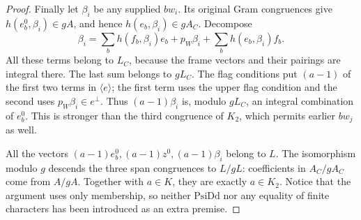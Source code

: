 \documentclass[11pt,a4paper]{article}
\numberwithin{equation}{section}
\theoremstyle{remark}\newtheorem{remark}[theorem]{Remark}
\begin{document}
\begin{proof}
Finally let \(\beta_i\) be any supplied \(bw_i\).  Its original
Gram congruences give \(h(e_b^0,\beta_i)\in gA\), and hence
\(h(e_b,\beta_i)\in gA_C\).  Decompose
\[
 \beta_i=\sum_b h(f_b,\beta_i)e_b+p_W\beta_i
                              +\sum_b h(e_b,\beta_i)f_b.
\]
All these terms belong to \(L_C\), because the frame vectors
and their pairings are integral there.  The last sum belongs to
\(gL_C\).  The flag conditions put \((a-1)\) of the first
two terms in \(\langle e\rangle\); the first term uses the
upper flag condition and the second uses \(p_W\beta_i\in e^\perp\).
Thus \((a-1)\beta_i\) is, modulo \(gL_C\), an integral
combination of \(e_b^0\).  This is stronger than the third
congruence of \(K_2\), which permits earlier \(bw_j\) as well.

All the vectors \((a-1)e_b^0,(a-1)z^0,(a-1)\beta_i\)
belong to \(L\).  The isomorphism modulo \(g\) descends the
three span congruences to \(L/gL\): coefficients in \(A_C/gA_C\)
come from \(A/gA\).  Together with \(a\in K\), they are
exactly \(a\in K_2\).  Notice that the argument uses only
membership, so neither \(\mathrm{PsiDd}\) nor any equality of
finite characters has been introduced as an extra premise.
\end{proof}

\end{document}
